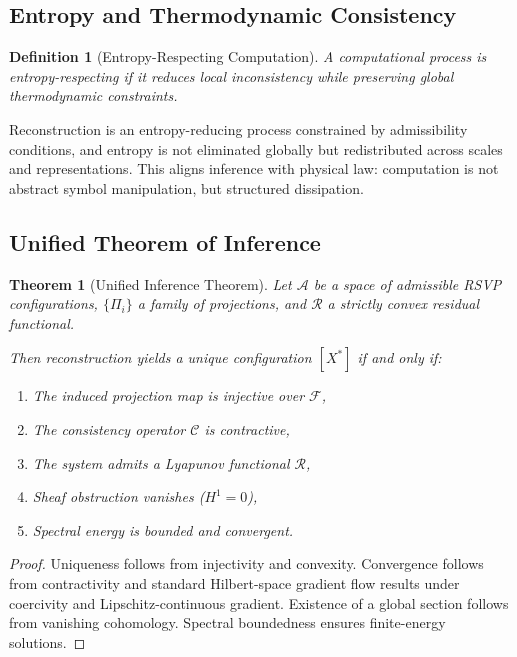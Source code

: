 \documentclass[12pt]{article}
\newtheorem{definition}{Definition}
\newtheorem{theorem}{Theorem}
\begin{document}
\subsection{Entropy and Thermodynamic Consistency}

\begin{definition}[Entropy-Respecting Computation]
A computational process is entropy-respecting if it reduces local inconsistency while preserving global thermodynamic constraints.
\end{definition}

Reconstruction is an entropy-reducing process constrained by admissibility conditions, and entropy is not eliminated globally but redistributed across scales and representations. This aligns inference with physical law: computation is not abstract symbol manipulation, but structured dissipation.

\subsection{Unified Theorem of Inference}

\begin{theorem}[Unified Inference Theorem]
Let $\mathcal{A}$ be a space of admissible RSVP configurations, $\{\Pi_i\}$ a family of projections, and $\mathcal{R}$ a strictly convex residual functional.

Then reconstruction yields a unique configuration $[X^*]$ if and only if:
\begin{enumerate}
\item The induced projection map is injective over $\mathcal{F}$,
\item The consistency operator $\mathcal{C}$ is contractive,
\item The system admits a Lyapunov functional $\mathcal{R}$,
\item Sheaf obstruction vanishes ($H^1 = 0$),
\item Spectral energy is bounded and convergent.
\end{enumerate}
\end{theorem}

\begin{proof}
Uniqueness follows from injectivity and convexity. Convergence follows from contractivity and standard Hilbert-space gradient flow results under coercivity and Lipschitz-continuous gradient. Existence of a global section follows from vanishing cohomology. Spectral boundedness ensures finite-energy solutions.
\end{proof}
\end{document}
